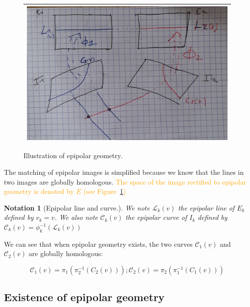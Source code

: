 \documentclass{ipol}
\newcommand{\PiOT}[1]{\pi_1(\pi_2^{-1}(#1))}
\newcommand{\PiTO}[1]{\pi_2(\pi_1^{-1}(#1))}
\newcommand{\LineE}[1]{\ensuremath{\mathcal{L}_{#1}}}
\newcommand{\LineK}{\LineE{k}}
\newcommand{\CurveE}[1]{\ensuremath{\mathcal{C}_{#1}}}
\newcommand{\CurveO}{\CurveE{1}}
\newcommand{\CurveT}{\CurveE{2}}
\newcommand{\CurveK}{\CurveE{k}}
\newtheorem{notation}{Notation}
\newcommand{\er}[1]{\textcolor{orange}{#1}}
\begin{document}
\begin{figure}
\centering
\begin{tabular}{||c||}
 \hline \hline
\includegraphics[width=15cm]{FIGS/Epip.jpg} 
 \\ \hline \hline
\end{tabular}
\caption{Illustration of epipolar geometry.}
\label{FigDefEpip}
\end{figure}


\noindent The matching of epipolar images is simplified because we know that the lines in two images are globally homologous. 
\er{The space of the image rectified to epipolar geometry is denoted by $E$ (see Figure~\ref{FigDefEpip})}


\begin{notation}[Epipolar line and curve.]
We note $\LineK(v)$   the epipolar  line of $E_k$ defined by $v_k=v$. We also note $\CurveK(v)$ the epipolar
curve of $I_k$ defined by $\CurveK(v) = \phi_k^{-1}(\LineK(v))$
\end{notation}
%
\noindent We can see that when epipolar geometry exists, the two curves $\CurveO(v)$ and $\CurveT(v)$ are globally homologous:

\begin{equation}
     \CurveO(v) = \PiOT{C_2(v)}   ;  \CurveT(v) = \PiTO{C_1(v)} \label{Eq:CurvHom}
\end{equation}



\subsection{Existence of epipolar geometry}
\end{document}
